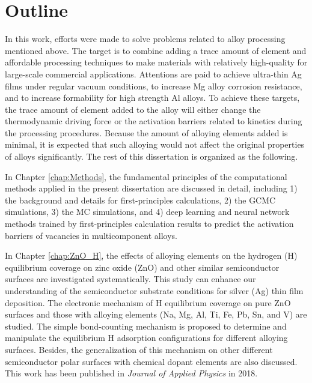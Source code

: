 \section{Outline}

In this work, efforts were made to solve problems related to alloy processing mentioned above. The target is to combine adding a trace amount of element and affordable processing techniques to make materials with relatively high-quality for large-scale commercial applications. Attentions are paid to achieve ultra-thin Ag films under regular vacuum conditions, to increase Mg alloy corrosion resistance, and to increase formability for high strength Al alloys. To achieve these targets, the trace amount of element added to the alloy will either change the thermodynamic driving force or the activation barriers related to kinetics during the processing procedures. Because the amount of alloying elements added is minimal, it is expected that such alloying would not affect the original properties of alloys significantly. The rest of this dissertation is organized as the following.

In Chapter \ref{chap:Methods}, the fundamental principles of the computational methods applied in the present dissertation are discussed in detail, including 1) the background and details for first-principles calculations, 2) the \acf{GCMC} simulations, 3) the \acf{MC} simulations, and 4) deep learning and neural network methods trained by first-principles calculation results to predict the activation barriers of vacancies in multicomponent alloys.

In Chapter \ref{chap:ZnO_H}, the effects of alloying elements on the hydrogen (H) equilibrium coverage on zinc oxide (ZnO) and other similar semiconductor surfaces are investigated systematically. This study can enhance our understanding of the semiconductor substrate conditions for silver (Ag) thin film deposition. The electronic mechanism of H equilibrium coverage on pure ZnO surfaces and those with alloying elements (Na, Mg, Al, Ti, Fe, Pb, Sn, and V) are studied. The simple bond-counting mechanism is proposed to determine and manipulate the equilibrium H adsorption configurations for different alloying surfaces. Besides, the generalization of this mechanism on other different semiconductor polar surfaces with chemical dopant elements are also discussed. This work has been published in \textit{Journal of Applied Physics} in 2018. \cite{zhang2018tuning}

